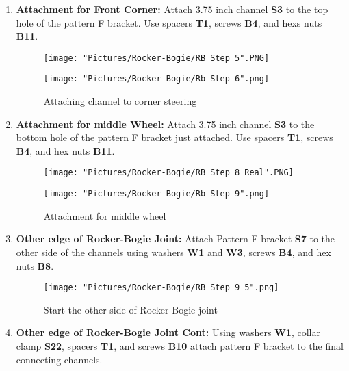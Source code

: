\documentclass[12pt]{article}
\begin{document}
\begin{enumerate}
\item \textbf{Attachment for Front Corner: } Attach 3.75 inch channel \textbf{S3} to the top hole of the pattern F bracket. Use spacers \textbf{T1}, screws \textbf{B4}, and hexs nuts \textbf{B11}. 

\begin{figure}[H]
  \centering
  \begin{minipage}[b]{0.45\textwidth}
    \texttt{[image: "Pictures/Rocker-Bogie/RB Step 5".PNG]}
  \end{minipage}
  \hfill
  \begin{minipage}[b]{0.45\textwidth}
    \texttt{[image: "Pictures/Rocker-Bogie/Rb Step 6".png]}
  \end{minipage}
  \caption{Attaching channel to corner steering }
\end{figure}


\item \textbf{Attachment for middle Wheel: } Attach 3.75 inch channel \textbf{S3} to the bottom hole of the pattern F bracket just attached. Use spacers \textbf{T1}, screws \textbf{B4}, and hex nuts \textbf{B11}. 

\begin{figure}[H]
  \centering
  \begin{minipage}[b]{0.45\textwidth}
    \texttt{[image: "Pictures/Rocker-Bogie/RB Step 8 Real".PNG]}
  \end{minipage}
  \hfill
  \begin{minipage}[b]{0.45\textwidth}
    \texttt{[image: "Pictures/Rocker-Bogie/Rb Step 9".png]}
  \end{minipage}
  \caption{Attachment for middle wheel}
\end{figure}
 

\item \textbf{Other edge of Rocker-Bogie Joint:} Attach Pattern F bracket \textbf{S7} to the other side of the channels using washers \textbf{W1} and \textbf{W3}, screws \textbf{B4}, and hex nuts \textbf{B8}. 

\begin{figure}[H]
	\centering
	\texttt{[image: "Pictures/Rocker-Bogie/RB Step 9\_5".png]}
	\caption{Start the other side of Rocker-Bogie joint}
\end{figure}

\item \textbf{Other edge of Rocker-Bogie Joint Cont: } Using washers \textbf{W1}, collar clamp \textbf{S22},  spacers \textbf{T1}, and screws \textbf{B10} attach pattern F bracket to the final connecting channels. 


\end{enumerate}
\end{document}
